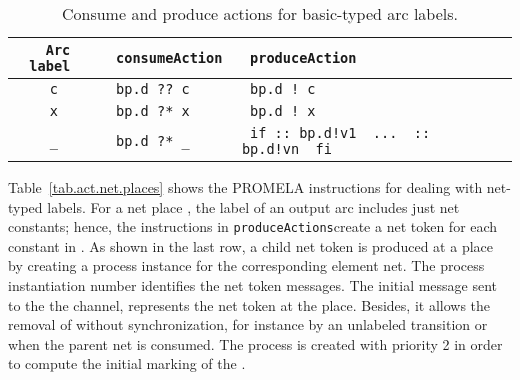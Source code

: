 \documentclass{llncs}
\begin{document}
\small


\begin{table}[h!]
\begin{center}\begin{tabular}{|c|l|l|l|}
      \hline
\verb" Arc label "  & \verb" consumeAction " & \verb" produceAction " \\
      \hline
      \verb"c"  & \verb" bp.d ?? c "  & \verb" bp.d ! c " \\
      \hline
      \verb"x"  & \verb" bp.d ?* x "  & \verb" bp.d ! x "\\
      \hline
      \verb"_"  & \verb" bp.d ?* _ "  & \verb" if :: bp.d!v1  ...  :: bp.d!vn  fi  "\\
      \hline
\end{tabular}\end{center}
\vspace{-2pt}
\caption{Consume and produce actions for basic-typed arc labels.}
\label{tab.act.bas.places}
\end{table}
\normalsize


Table~\ref{tab.act.net.places} shows the PROMELA instructions for dealing with net-typed labels. For a net place , the label of an output arc  includes just net constants; hence, the instructions in \small\verb"produceActions"\nfont create a net token for each constant in . As shown in the last row, a child net token  is produced at a place  by creating a process instance for the corresponding element net. The process instantiation number identifies the net token messages. The initial message sent to the the channel, represents the net token at the place. Besides, it allows the removal of  without  synchronization, for instance by an unlabeled transition or when the parent net is consumed. The process is created with priority 2 in order to compute the initial marking of the .
\end{document}
